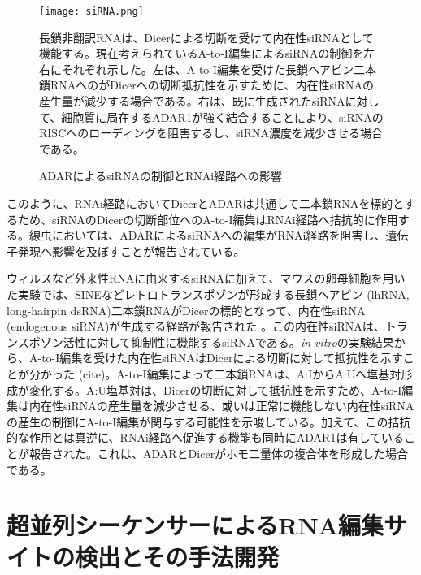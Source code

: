 \begin{figure}[!h]
	\begin{center}
		\texttt{[image: siRNA.png]}
	\end{center}
	\caption{ADARによるsiRNAの制御とRNAi経路への影響}
	\begin{flushleft}
		\small{長鎖非翻訳RNAは、Dicerによる切断を受けて内在性siRNAとして機能する。現在考えられているA-to-I編集によるsiRNAの制御を左右にそれぞれ示した。左は、A-to-I編集を受けた長鎖ヘアピン二本鎖RNAへのがDicerへの切断抵抗性を示すために、内在性siRNAの産生量が減少する場合である。右は、既に生成されたsiRNAに対して、細胞質に局在するADAR1が強く結合することにより、siRNAのRISCへのローディングを阻害するし、siRNA濃度を減少させる場合である。}
	\end{flushleft}
	\label{fig:adar_siRNA}
\end{figure}

このように、RNAi経路においてDicerとADARは共通して二本鎖RNAを標的とするため、siRNAのDicerの切断部位へのA-to-I編集はRNAi経路へ拮抗的に作用する。線虫においては、ADARによるsiRNAへの編集がRNAi経路を阻害し、遺伝子発現へ影響を及ぼすことが報告されている。
\par
ウィルスなど外来性RNAに由来するsiRNAに加えて、マウスの卵母細胞を用いた実験では、SINEなどレトロトランスポゾンが形成する長鎖ヘアピン (lhRNA, long-hairpin dsRNA)二本鎖RNAがDicerの標的となって、内在性siRNA (endogenous siRNA)が生成する経路が報告された \citep{Watanabe:2008aa}。この内在性siRNAは、トランスポゾン活性に対して抑制性に機能するsiRNAである。\textit{in vitro}の実験結果から、A-to-I編集を受けた内在性siRNAはDicerによる切断に対して抵抗性を示すことが分かった (cite)。A-to-I編集によって二本鎖RNAは、A:IからA:Uへ塩基対形成が変化する。A:U塩基対は、Dicerの切断に対して抵抗性を示すため、A-to-I編集は内在性siRNAの産生量を減少させる、或いは正常に機能しない内在性siRNAの産生の制御にA-to-I編集が関与する可能性を示唆している。加えて、この拮抗的な作用とは真逆に、RNAi経路へ促進する機能も同時にADAR1は有していることが報告された。これは、ADARとDicerがホモ二量体の複合体を形成した場合である。

\section{超並列シーケンサーによるRNA編集サイトの検出とその手法開発}
